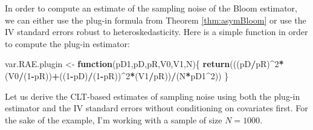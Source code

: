 \documentclass[]{book}
\newenvironment{Shaded}{\begin{snugshade}}{\end{snugshade}}
\newcommand{\ControlFlowTok}[1]{\textcolor[rgb]{0.13,0.29,0.53}{\textbf{#1}}}
\newcommand{\DecValTok}[1]{\textcolor[rgb]{0.00,0.00,0.81}{#1}}
\newcommand{\KeywordTok}[1]{\textcolor[rgb]{0.13,0.29,0.53}{\textbf{#1}}}
\newcommand{\NormalTok}[1]{#1}
\newcommand{\OperatorTok}[1]{\textcolor[rgb]{0.81,0.36,0.00}{\textbf{#1}}}
\newcommand{\StringTok}[1]{\textcolor[rgb]{0.31,0.60,0.02}{#1}}
\theoremstyle{definition}
\theoremstyle{definition}
\theoremstyle{definition}
\theoremstyle{remark}
\let\BeginKnitrBlock\begin \let\EndKnitrBlock\end
\begin{document}
\BeginKnitrBlock{remark}
\iffalse{} {Remark. } \fi{}In order to compute an estimate of the sampling noise of the Bloom estimator, we can either use the plug-in formula from Theorem \ref{thm:asymBloom} or use the IV standard errors robust to heteroskedasticity.
Here is a simple function in order to compute the plug-in estimator:
\EndKnitrBlock{remark}

\begin{Shaded}
\begin{Highlighting}[]
\NormalTok{var.RAE.plugin <-}\StringTok{ }\ControlFlowTok{function}\NormalTok{(pD1,pD,pR,V0,V1,N)\{}
  \KeywordTok{return}\NormalTok{(((pD}\OperatorTok{/}\NormalTok{pR)}\OperatorTok{^}\DecValTok{2}\OperatorTok{*}\NormalTok{(V0}\OperatorTok{/}\NormalTok{(}\DecValTok{1}\OperatorTok{-}\NormalTok{pR))}\OperatorTok{+}\NormalTok{((}\DecValTok{1}\OperatorTok{-}\NormalTok{pD)}\OperatorTok{/}\NormalTok{(}\DecValTok{1}\OperatorTok{-}\NormalTok{pR))}\OperatorTok{^}\DecValTok{2}\OperatorTok{*}\NormalTok{(V1}\OperatorTok{/}\NormalTok{pR))}\OperatorTok{/}\NormalTok{(N}\OperatorTok{*}\NormalTok{pD1}\OperatorTok{^}\DecValTok{2}\NormalTok{))}
\NormalTok{\}}
\end{Highlighting}
\end{Shaded}

\BeginKnitrBlock{example}
\protect\hypertarget{exm:unnamed-chunk-104}{}{\label{exm:unnamed-chunk-104} }Let us derive the CLT-based estimates of sampling noise using both the plug-in estimator and the IV standard errors without conditioning on covariates first.
For the sake of the example, I'm working with a sample of size \(N=1000\).
\EndKnitrBlock{example}
\end{document}
